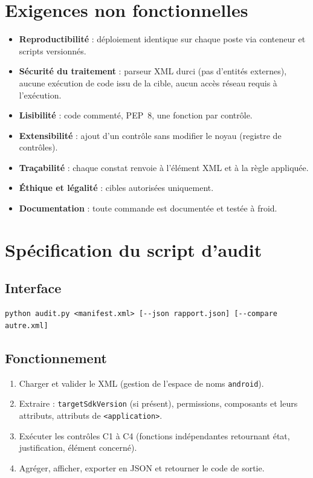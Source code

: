 \documentclass[11pt,a4paper]{article}
\newcommand{\code}[1]{{\NoAutoSpacing\texttt{\small #1}}}
\newcommand{\code}[1]{{\texttt{\small #1}}}
\begin{document}
\section{Exigences non fonctionnelles}
\begin{itemize}
  \item \textbf{Reproductibilité} : déploiement identique sur chaque poste via conteneur et scripts versionnés.
  \item \textbf{Sécurité du traitement} : parseur XML durci (pas d'entités externes), aucune exécution de code issu de la cible, aucun accès réseau requis à l'exécution.
  \item \textbf{Lisibilité} : code commenté, PEP~8, une fonction par contrôle.
  \item \textbf{Extensibilité} : ajout d'un contrôle sans modifier le noyau (registre de contrôles).
  \item \textbf{Traçabilité} : chaque constat renvoie à l'élément XML et à la règle appliquée.
  \item \textbf{Éthique et légalité} : cibles autorisées uniquement.
  \item \textbf{Documentation} : toute commande est documentée et testée à froid.
\end{itemize}

\section{Spécification du script d'audit}

\subsection{Interface}
\begin{lstlisting}
python audit.py <manifest.xml> [--json rapport.json] [--compare autre.xml]
\end{lstlisting}

\subsection{Fonctionnement}
\begin{enumerate}
  \item Charger et valider le XML (gestion de l'espace de noms \code{android}).
  \item Extraire : \code{targetSdkVersion} (si présent), permissions, composants et leurs attributs, attributs de \code{<application>}.
  \item Exécuter les contrôles C1 à C4 (fonctions indépendantes retournant état, justification, élément concerné).
  \item Agréger, afficher, exporter en JSON et retourner le code de sortie.
\end{enumerate}
\end{document}
